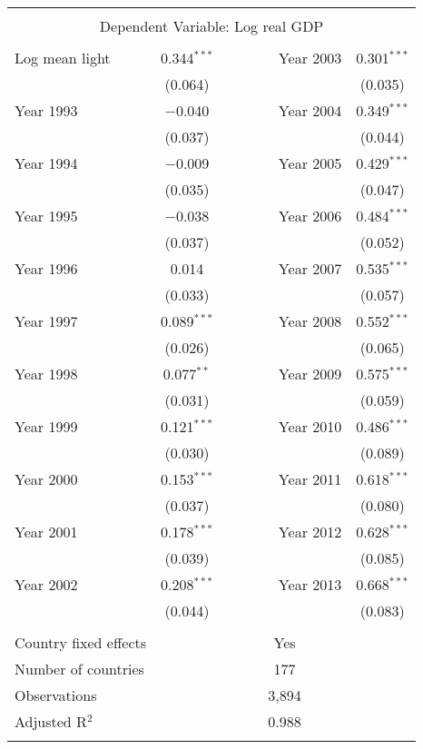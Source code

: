 \begin{tabular*}{\textwidth}{@{\extracolsep\fill}lcclc} 
\\
[-1.8ex]
\hline \\
[-1.8ex] 
\multicolumn{5}{c}{Dependent Variable: Log real GDP} \\ 
\hline \\
[-1.8ex] 
 Log mean light 	& 0.344$^{***}$ 	& \ \  \ \ \ & Year 2003 	& 0.301$^{***}$ 	\\ 
  			& (0.064)   		& & 			& (0.035) 		\\  
[1.0ex]
 Year 1993 		& $-$0.040 	& & Year 2004 	& 0.349$^{***}$ 	\\  
  			& (0.037) 		& & 			& (0.044) 		\\ 
[1.0ex]
  Year 1994 	& $-$0.009 	& & Year 2005 	& 0.429$^{***}$	\\ 
  			& (0.035) 		& &			& (0.047) 		\\ 
[1.0ex] 
 Year 1995 		& $-$0.038 	& & Year 2006 	& 0.484$^{***}$ 	\\ 
 			& (0.037) 		& & 			& (0.052) 		\\ 
[1.0ex]
 Year 1996 		& 0.014 		& & Year 2007 	& 0.535$^{***}$ 	\\ 
 			& (0.033) 		& &			& (0.057)  		\\ 
[1.0ex]
 Year 1997 		& 0.089$^{***}$ 	& & Year 2008 	& 0.552$^{***}$	\\ 
 			& (0.026) 		& &			& (0.065)		 \\ 
[1.0ex] 
 Year 1998 		& 0.077$^{**}$ 	& & Year 2009 	& 0.575$^{***}$ 	\\ 
 			& (0.031) 		& &			& (0.059) 		\\ 
[1.0ex]
 Year 1999 		& 0.121$^{***}$ 	& & Year 2010 	& 0.486$^{***}$	\\ 
  			& (0.030) 		& & 			& (0.089)		\\ 
[1.0ex] 
 Year 2000 		& 0.153$^{***}$ 	& & Year 2011 	& 0.618$^{***}$	\\ 
  			& (0.037) 		& & 			& (0.080)		\\ 
[1.0ex] 
 Year 2001 		& 0.178$^{***}$ 	& & Year 2012 	& 0.628$^{***}$	\\ 
  			& (0.039) 		& & 			& (0.085)		\\ 
[1.0ex]			
 Year 2002 		& 0.208$^{***}$ 	& & Year 2013 	& 0.668$^{***}$	\\ 
  			& (0.044) 		& &			& (0.083)		 \\ 
[1.0ex]			
\hline \\
[-1.8ex] 
Country fixed effects & \multicolumn{4}{c}{Yes}  \\ 
Number of countries & \multicolumn{4}{c}{177}  \\ 
Observations & \multicolumn{4}{c}{3,894} \\ 
Adjusted R$^{2}$ & \multicolumn{4}{c}{0.988} \\ 
\hline 
\hline \\
[-1.5ex] %
\end{tabular*} 
